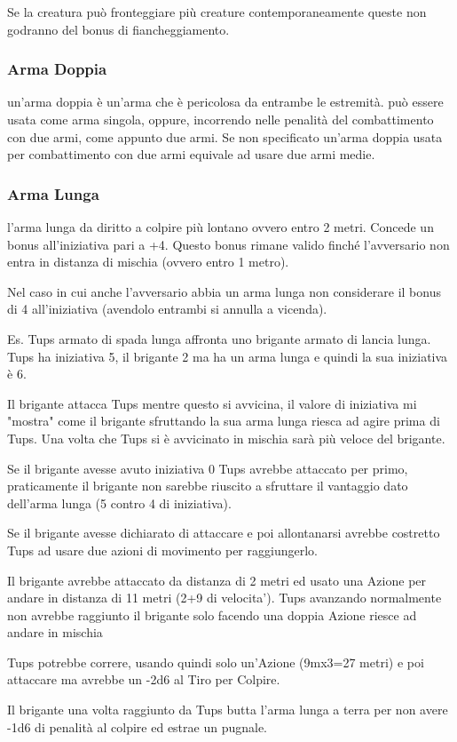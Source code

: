 \documentclass[a4paper,11pt,twoside,openany]{book}
\begin{document}
\bigskip

Se la creatura può fronteggiare più creature contemporaneamente queste non godranno del bonus di fiancheggiamento.

\subsubsection{Arma Doppia} un'arma doppia è un'arma che è pericolosa da entrambe le estremità. può essere usata come arma singola, oppure, incorrendo nelle penalità del combattimento con due armi, come appunto due armi. Se non specificato un'arma doppia usata per combattimento con due armi equivale ad usare due armi medie.

\subsubsection{Arma Lunga} l'arma lunga da diritto a colpire più lontano ovvero entro 2 metri. Concede un bonus all'iniziativa pari a +4. Questo bonus rimane valido finché l'avversario non entra in distanza di mischia (ovvero entro 1 metro).

Nel caso in cui anche l'avversario abbia un arma lunga non considerare il bonus di 4 all'iniziativa (avendolo entrambi si annulla a vicenda).

\begin{tcolorbox}[title = Esempio di Combattimento con Arma Lunga] 
Es. Tups armato di spada lunga affronta uno brigante armato di lancia lunga. Tups ha iniziativa 5, il brigante 2 ma ha un arma lunga e quindi la sua iniziativa è 6.

Il brigante attacca Tups mentre questo si avvicina, il valore di iniziativa mi "mostra" come il brigante sfruttando la sua arma lunga riesca ad agire prima di Tups. Una volta che Tups si è avvicinato in mischia sarà più veloce del brigante.

Se il brigante avesse avuto iniziativa 0 Tups avrebbe attaccato per primo, praticamente il brigante non sarebbe riuscito a sfruttare il vantaggio dato dell'arma lunga (5 contro 4 di iniziativa).

Se il brigante avesse dichiarato di attaccare e poi allontanarsi avrebbe costretto Tups ad usare due azioni di movimento per raggiungerlo.

Il brigante avrebbe attaccato da distanza di 2 metri ed usato una Azione per andare in distanza di 11 metri (2+9 di velocita'). Tups avanzando normalmente non avrebbe raggiunto il brigante solo facendo una doppia Azione riesce ad andare in mischia

Tups potrebbe correre, usando quindi solo un'Azione (9mx3=27 metri) e poi attaccare ma avrebbe un -2d6 al Tiro per Colpire.

Il brigante una volta raggiunto da Tups butta l'arma lunga a terra per non avere -1d6 di penalità al colpire ed estrae un pugnale.
\end{tcolorbox}
\end{document}
